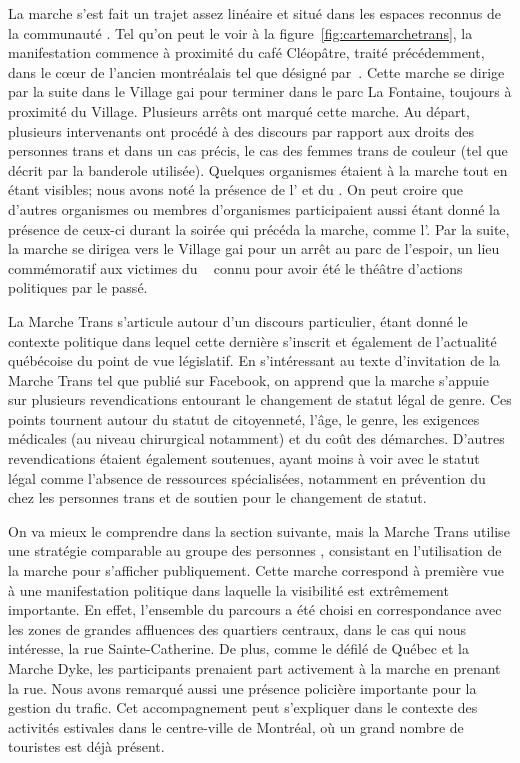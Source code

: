 La marche s'est fait un trajet assez linéaire et situé dans les espaces reconnus de la communauté \lgbt{}.
Tel qu'on peut le voir à la figure~\ref{fig:cartemarchetrans}, la manifestation commence à proximité du café Cléopâtre, traité précédemment, dans le cœur de l'ancien  montréalais tel que désigné par~\citet{Chamberland1993a}.
Cette marche se dirige par la suite dans le Village gai pour terminer dans le parc La Fontaine, toujours à proximité du Village.
Plusieurs arrêts ont marqué cette marche.
Au départ, plusieurs intervenants ont procédé à des discours par rapport aux droits des personnes trans et dans un cas précis, le cas des femmes trans de couleur (tel que décrit par la banderole utilisée).
Quelques organismes étaient à la marche tout en étant visibles; nous avons noté la présence de l'\atq{} et du \rlq{}.
On peut croire que d'autres organismes ou membres d'organismes participaient aussi étant donné la présence de ceux-ci durant la soirée qui précéda la marche, comme l'\astteq{}.
Par la suite, la marche se dirigea vers le Village gai pour un arrêt au parc de l'espoir, un lieu commémoratif aux victimes du \sida{}~\citep{Lafontaine2012} connu pour avoir été le théâtre d'actions politiques par le passé.

La Marche Trans s'articule autour d'un discours particulier, étant donné le contexte politique dans lequel cette dernière s'inscrit et également de l'actualité québécoise du point de vue législatif.
En s'intéressant au texte d'invitation de la Marche Trans tel que publié sur Facebook, on apprend que la marche s'appuie sur plusieurs revendications entourant le changement de statut légal de genre.
Ces points tournent autour du statut de citoyenneté, l'âge, le genre, les exigences médicales (au niveau chirurgical notamment) et du coût des démarches.
D'autres revendications étaient également soutenues, ayant moins à voir avec le statut légal comme l'absence de ressources spécialisées, notamment en prévention du \vih{} chez les personnes trans et de soutien pour le changement de statut.

On va mieux le comprendre dans la section suivante, mais la Marche Trans utilise une stratégie comparable au groupe des personnes \dyke{}, consistant en l'utilisation de la marche pour s'afficher publiquement.
Cette marche correspond à première vue à une manifestation politique dans laquelle la visibilité est extrêmement importante.
En effet, l'ensemble du parcours a été choisi en correspondance avec les zones de grandes affluences des quartiers centraux, dans le cas qui nous intéresse, la rue Sainte-Catherine.
De plus, comme le défilé de Québec et la Marche Dyke, les participants prenaient part activement à la marche en prenant la rue.
Nous avons remarqué aussi une présence policière importante pour la gestion du trafic.
Cet accompagnement peut s'expliquer dans le contexte des activités estivales dans le centre-ville de Montréal, où un grand nombre de touristes est déjà présent.

